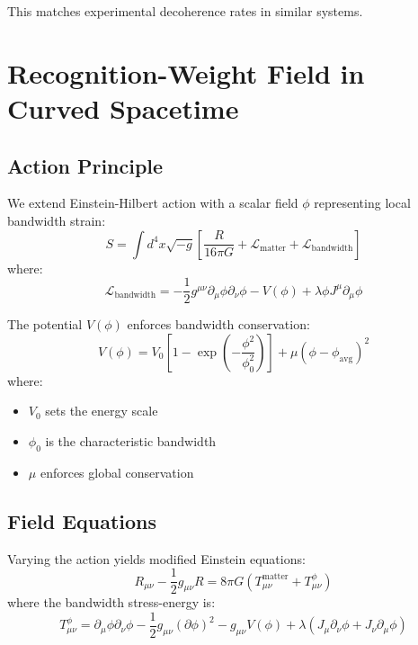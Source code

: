 \documentclass[twocolumn,prd,amsmath,amssymb,aps,superscriptaddress,nofootinbib]{revtex4-2}
\begin{document}
This matches experimental decoherence rates in similar systems.

\section{Recognition-Weight Field in Curved Spacetime}
\label{sec:field}

\subsection{Action Principle}

We extend Einstein-Hilbert action with a scalar field $\phi$ representing local bandwidth strain:
\begin{equation}
S = \int d^4x \sqrt{-g} \left[\frac{R}{16\pi G} + \mathcal{L}_{\text{matter}} + \mathcal{L}_{\text{bandwidth}}\right]
\label{eq:action}
\end{equation}
where:
\begin{equation}
\mathcal{L}_{\text{bandwidth}} = -\frac{1}{2} g^{\mu\nu} \partial_\mu\phi \partial_\nu\phi - V(\phi) + \lambda\phi J^\mu \partial_\mu\phi
\end{equation}

The potential $V(\phi)$ enforces bandwidth conservation:
\begin{equation}
V(\phi) = V_0\left[1 - \exp\left(-\frac{\phi^2}{\phi_0^2}\right)\right] + \mu(\phi - \phi_{\text{avg}})^2
\label{eq:potential}
\end{equation}
where:
\begin{itemize}
\item $V_0$ sets the energy scale
\item $\phi_0$ is the characteristic bandwidth
\item $\mu$ enforces global conservation
\end{itemize}

\subsection{Field Equations}

Varying the action yields modified Einstein equations:
\begin{equation}
R_{\mu\nu} - \frac{1}{2}g_{\mu\nu} R = 8\pi G(T_{\mu\nu}^{\text{matter}} + T_{\mu\nu}^\phi)
\label{eq:einstein_modified}
\end{equation}
where the bandwidth stress-energy is:
\begin{equation}
T_{\mu\nu}^\phi = \partial_\mu\phi \partial_\nu\phi - \frac{1}{2}g_{\mu\nu}(\partial\phi)^2 - g_{\mu\nu} V(\phi) + \lambda(J_\mu \partial_\nu\phi + J_\nu \partial_\mu\phi)
\end{equation}
\end{document}
